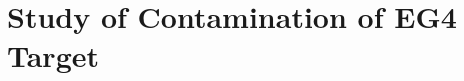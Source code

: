 

\section{Study of  Contamination of EG4  Target}   %

\begin{comment}  %
The first analysis goal for the EG4 \nd3 data set is to extract the difference of polarized cross sections (from the difference of yields) as given by the following expression:

\begin{equation}
  \delta \sigma = \sigma^+ - \sigma^- = \frac{1}{N_t}\cdot \left[ \frac{N^+}{N^+_{e^-}} - \frac{N^-}{N^-_{e^-}} \right]\cdot \frac{1}{\Delta\Omega}\cdot \frac{1}{E_{detector}} %
  \label{eqXSdiff}
\end{equation}

where, 
\begin{itemize}
  \item $N_t$ = Number density of deuteron nucleii in the target = $3 N_a l_A \frac{\rho_A}{m_A}$, with 
    \begin{itemize}
      \item 3: number of Deuteron atoms in a \hnd3 molecule
      \item $N_a = 6.02\times 10^{23}$: Avogadro's number
      \item $l_A =$ target length (cm) $\times$ packing fraction
      \item $\rho_A = 1.056 (g/cm^3)$: Target density
      \item $m_A = 21.042414237 (g)$: Mass of target molecule \hnd3   %


\end{comment}
